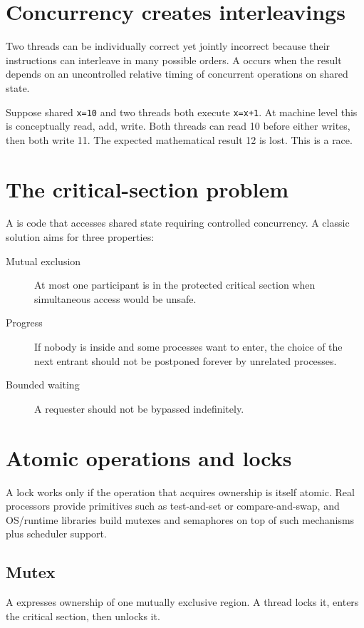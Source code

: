 \section{Concurrency creates interleavings}
Two threads can be individually correct yet jointly incorrect because their instructions can interleave in many possible orders. A  occurs when the result depends on an uncontrolled relative timing of concurrent operations on shared state.

\begin{workedexample}
Suppose shared \texttt{x=10} and two threads both execute \texttt{x=x+1}. At machine level this is conceptually read, add, write. Both threads can read 10 before either writes, then both write 11. The expected mathematical result 12 is lost. This is a  race.
\end{workedexample}

\section{The critical-section problem}
A  is code that accesses shared state requiring controlled concurrency. A classic solution aims for three properties:
\begin{description}
  \item[Mutual exclusion] At most one participant is in the protected critical section when simultaneous access would be unsafe.
  \item[Progress] If nobody is inside and some processes want to enter, the choice of the next entrant should not be postponed forever by unrelated processes.
  \item[Bounded waiting] A requester should not be bypassed indefinitely.
\end{description}

\section{Atomic operations and locks}
A lock works only if the operation that acquires ownership is itself atomic. Real processors provide primitives such as test-and-set or compare-and-swap, and OS/runtime libraries build mutexes and semaphores on top of such mechanisms plus scheduler support.

\subsection{Mutex}
A  expresses ownership of one mutually exclusive region. A thread locks it, enters the critical section, then unlocks it.

